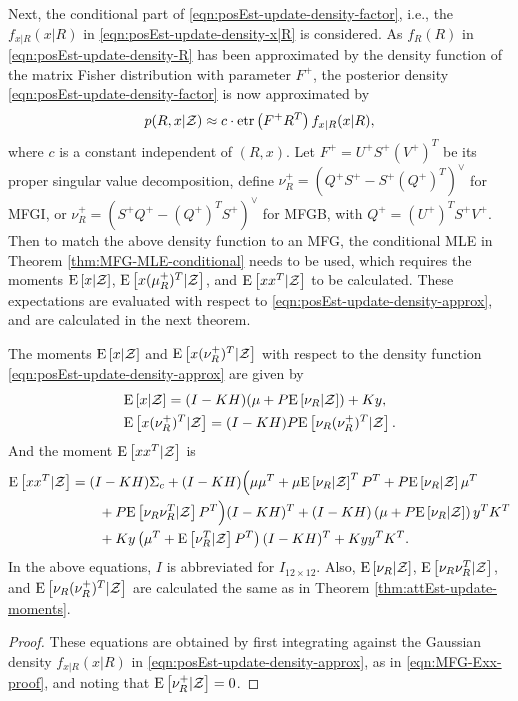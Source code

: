 Next, the conditional part of \eqref{eqn:posEst-update-density-factor}, i.e., the $f_{x|R}(x|R)$ in \eqref{eqn:posEst-update-density-x|R} is considered.
As $f_R(R)$ in \eqref{eqn:posEst-update-density-R} has been approximated by the density function of the matrix Fisher distribution with parameter $F^+$, the posterior density \eqref{eqn:posEst-update-density-factor} is now approximated by
\begin{align} \label{eqn:posEst-update-density-approx}
	p(R,x|\mathcal{Z}) \approx c \cdot \mathrm{etr}\left( F^+R^T \right) f_{x|R}(x|R),
\end{align}
where $c$ is a constant independent of $(R,x)$.
Let $F^+ = U^+S^+(V^+)^T$ be its proper singular value decomposition, define $\nu_R^+ = (Q^+S^+ - S^+(Q^+)^T)^\vee$ for MFGI, or $\nu_R^+ = (S^+Q^+ - (Q^+)^TS^+)^\vee$ for MFGB, with $Q^+ = (U^+)^TS^+V^+$.
Then to match the above density function to an MFG, the conditional MLE in Theorem \ref{thm:MFG-MLE-conditional} needs to be used, which requires the moments $\mathrm{E}\left[ x|\mathcal{Z} \right]$, $\mathrm{E}\left[ x(\mu_R^+)^T|\mathcal{Z} \right]$, and $\mathrm{E}\left[ xx^T|\mathcal{Z} \right]$ to be calculated.
These expectations are evaluated with respect to \eqref{eqn:posEst-update-density-approx}, and are calculated in the next theorem.

\begin{theorem} \label{thm:posEst-update-moments}
	The moments $\mathrm{E}\left[ x|\mathcal{Z} \right]$ and $\mathrm{E}\left[ x(\nu_R^+)^T|\mathcal{Z} \right]$ with respect to the density function \eqref{eqn:posEst-update-density-approx} are given by
	\begin{align}
		&\mathrm{E}\left[ x|\mathcal{Z} \right] = (I-KH)(\mu+P\mathrm{E}\left[ \nu_R|\mathcal{Z} \right]) + Ky, \\
		&\mathrm{E}\left[ x(\nu_R^+)^T|\mathcal{Z} \right] = (I-KH)P\mathrm{E}\left[ \nu_R(\nu_R^+)^T|\mathcal{Z} \right].
	\end{align}
	And the moment $\mathrm{E}\left[ xx^T|\mathcal{Z} \right]$ is
	\begin{align}
		\mathrm{E}\left[ xx^T|\mathcal{Z} \right] &= (I-KH)\Sigma_c + (I-KH) \Big( \mu\mu^T + \mu\mathrm{E}\left[ \nu_R|\mathcal{Z} \right]^TP^T + P\mathrm{E}\left[ \nu_R|\mathcal{Z} \right]\mu^T \nonumber \\
		&\qquad + P\mathrm{E}\left[ \nu_R\nu_R^T|\mathcal{Z} \right]P^T \Big) (I-KH)^T + (I-KH)\left( \mu + P\mathrm{E}\left[ \nu_R|\mathcal{Z} \right] \right)y^TK^T \nonumber \\
		&\qquad + Ky\left(\mu^T + \mathrm{E}\left[ \nu_R^T|\mathcal{Z} \right]P^T\right)(I-KH)^T + Kyy^TK^T.
	\end{align}
	In the above equations, $I$ is abbreviated for $I_{12\times 12}$.
	Also, $\mathrm{E}\left[ \nu_R|\mathcal{Z} \right]$, $\mathrm{E}\left[ \nu_R\nu_R^T|\mathcal{Z} \right]$, and $\mathrm{E}\left[ \nu_R(\nu_R^+)^T|\mathcal{Z} \right]$ are calculated the same as in Theorem \ref{thm:attEst-update-moments}.
\end{theorem}
\begin{proof}
	These equations are obtained by first integrating against the Gaussian density $f_{x|R}(x|R)$ in \eqref{eqn:posEst-update-density-approx}, as in \eqref{eqn:MFG-Exx-proof}, and noting that $\mathrm{E}\left[ \nu_R^+|\mathcal{Z} \right] = 0$.
\end{proof}

